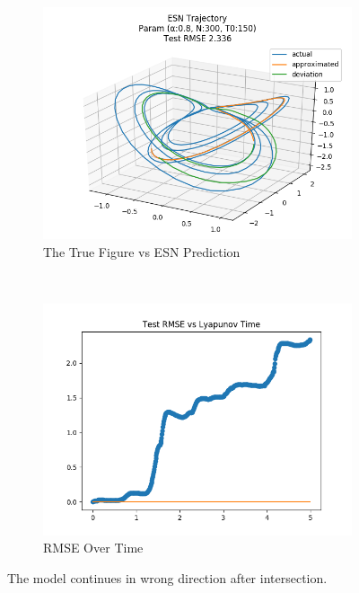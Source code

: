 \documentclass{article}
\begin{document}
\begin{figure}[H]
    \centering
    \begin{subfigure}[b]{0.45\textwidth}
        \includegraphics[width=\textwidth]{doc/paper/images/lorenz/rank_1_param_230_fit.png}
        \caption{The True Figure vs ESN Prediction}
        \label{fig:lorenz_r1_fit}
    \end{subfigure}
    ~
    \begin{subfigure}[b]{0.45\textwidth}
        \includegraphics[width=\textwidth]{doc/paper/images/lorenz/rank_1_param_230_rmse.png}
        \caption{RMSE Over Time}
        \label{fig:lorenz_r1_rmse}
    \end{subfigure}
    \caption{The model continues in wrong direction after intersection.}
    \label{fig:lorenz_r1}
\end{figure}
\end{document}
